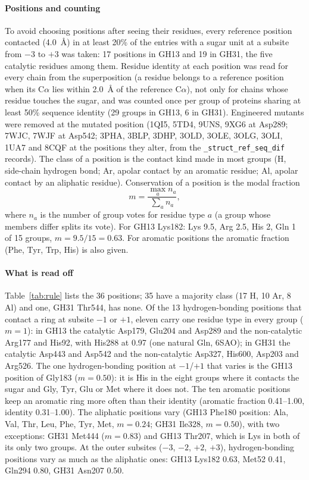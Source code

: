 \documentclass[preprint,12pt]{elsarticle}
\begin{document}
\paragraph{Positions and counting} To avoid choosing positions after seeing their residues,
every reference position contacted (4.0~\AA) in at least 20\% of the entries with a sugar
unit at a subsite from $-3$ to $+3$ was taken: 17 positions in GH13 and 19 in GH31, the five
catalytic residues among them. Residue identity at each position was read for every chain from
the superposition (a residue belongs to a reference position when its C$\alpha$ lies within
2.0~\AA{} of the reference C$\alpha$), not only for chains whose residue touches the sugar, and
was counted once per group of proteins sharing at least 50\% sequence identity (29 groups in
GH13, 6 in GH31). Engineered mutants were removed at the mutated position (1QI5, 5TD4, 9UNS,
9XG6 at Asp289; 7WJC, 7WJF at Asp542; 3PHA, 3BLP, 3DHP, 3OLD, 3OLE, 3OLG, 3OLI, 1UA7 and 8CQF at
the positions they alter, from the \texttt{\_struct\_ref\_seq\_dif} records). The class of a
position is the contact kind made in most groups (H, side-chain hydrogen bond; Ar, apolar
contact by an aromatic residue; Al, apolar contact by an aliphatic residue). Conservation of a
position is the modal fraction
\begin{equation}
m = \frac{\max_a n_a}{\sum_a n_a},
\label{eq:modal}
\end{equation}
where $n_a$ is the number of group votes for residue type $a$ (a group whose members differ
splits its vote). For GH13 Lys182: Lys 9.5, Arg 2.5, His 2, Gln 1 of 15 groups,
$m = 9.5/15 = 0.63$. For aromatic positions the aromatic fraction (Phe, Tyr, Trp, His) is also
given.

\paragraph{What is read off} Table~\ref{tab:rule} lists the 36 positions; 35 have a majority class
(17 H, 10 Ar, 8 Al) and one, GH31 Thr544, has none. Of the 13 hydrogen-bonding positions that contact a ring at subsite $-1$
or $+1$, eleven carry one residue type in every group ($m = 1$): in GH13 the catalytic Asp179,
Glu204 and Asp289 and the non-catalytic Arg177 and His92, with His288 at 0.97 (one natural Gln,
6SAO); in GH31 the catalytic Asp443 and Asp542 and the non-catalytic Asp327, His600, Asp203 and
Arg526. The one hydrogen-bonding position at $-1$/$+1$ that varies is the GH13 position of
Gly183 ($m = 0.50$): it is His in the eight groups where it contacts the sugar and Gly, Tyr, Glu
or Met where it does not. The ten aromatic positions keep an aromatic ring more often than
their identity (aromatic fraction 0.41--1.00, identity 0.31--1.00). The aliphatic positions vary
(GH13 Phe180 position: Ala, Val, Thr, Leu, Phe, Tyr, Met, $m = 0.24$; GH31 Ile328, $m = 0.50$),
with two exceptions: GH31 Met444 ($m = 0.83$) and GH13 Thr207, which is Lys in both of
its only two groups. At the outer subsites ($-3$, $-2$, $+2$, $+3$),
hydrogen-bonding positions vary as much as the aliphatic ones: GH13 Lys182 0.63, Met52 0.41,
Gln294 0.80, GH31 Asn207 0.50.
\end{document}
